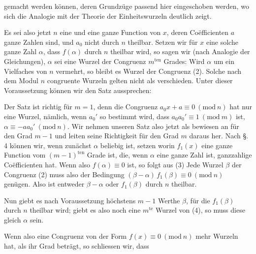 
gemacht werden k\"onnen, deren Grundz\"uge passend hier eingeschoben
werden, wo sich die Analogie mit der Theorie der Einheitswurzeln
deutlich zeigt.

Es sei also jetzt $n$ eine  und
eine ganze Function von $x$, deren Co\"efficienten $a$ ganze Zahlen
sind, und $a_0$ nicht durch $n$ theilbar. Setzen wir f\"ur $x$ eine
solche ganze Zahl $\alpha$, dass $f(\alpha)$ durch $n$ theilbar
wird, so sagen wir (nach Analogie der Gleichungen), $\alpha$ sei
eine Wurzel der Congruenz $m^{\text{ten}}$ Grades:
Wird $\alpha$ um ein Vielfaches von $n$ vermehrt, so bleibt es
Wurzel der Congruenz (2). Solche nach dem Modul $n$ congruente
Wurzeln gelten nicht als verschieden. Unter dieser Voraussetzung
k\"onnen wir den Satz aussprechen:


Der Satz ist richtig f\"ur $m = 1$, denn die Congruenz $a_0 x + a
\equiv 0\ (\mathrm{mod}\ n)$ hat nur eine Wurzel, n\"amlich, wenn
$a_0'$ so bestimmt wird, dass $a_0 a_0' \equiv 1\ (\mathrm{mod}\ m)$
ist, $\alpha \equiv -a a_0'\ (\mathrm{mod}\ n)$. Wir nehmen unseren
Satz also jetzt als bewiesen an f\"ur den Grad $m-1$ und leiten
seine Richtigkeit f\"ur den Grad $m$ daraus her. Nach \S.\,4 k\"onnen
wir, wenn zun\"achst $\alpha$ beliebig ist, setzen
worin $f_1(x)$ eine ganze Function vom $(m-1)^{\text{ten}}$ Grade
ist, die, wenn $\alpha$ eine ganze Zahl ist, ganzzahlige
Co\"efficienten hat. Wenn also $f(\alpha) \equiv 0$ ist, so folgt
aus (3)
Jede Wurzel $\beta$ der Congruenz (2) muss also der Bedingung
$(\beta - \alpha)\, f_1(\beta) \equiv 0\ (\mathrm{mod}\ n)$
gen\"ugen. Also ist entweder $\beta - \alpha$ oder $f_1(\beta)$
durch $n$ theilbar.

Nun giebt es nach Voraussetzung h\"ochstens $m-1$ Werthe $\beta$,
f\"ur die $f_1(\beta)$ durch $n$ theilbar wird; giebt es also noch
eine $m^{\text{te}}$ Wurzel von (4), so muss diese gleich $\alpha$
sein.

Wenn also eine Congruenz von der Form $f(x) \equiv 0\ (\mathrm{mod}\
n)$ mehr Wurzeln hat, als ihr Grad betr\"agt, so schliessen wir,
dass
